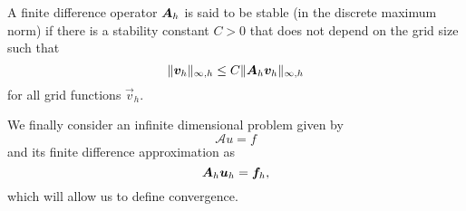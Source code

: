 \begin{definition}[Stability]
    A finite difference operator $\mat A_h$ is said to be stable (in the discrete maximum norm) if there is a stability constant $C>0$ that does not depend on the grid size such that
        \begin{equation}\label{def:stability}
            \| \vec v_h \|_{\infty,h} \leq C \|\mat A_h \vec v_h \|_{\infty,h}
        \end{equation}
        for all grid functions $\vec v_h$. 
\end{definition}
We finally consider an infinite dimensional problem given by
    \begin{equation}
        \mathcal A u = f
    \end{equation}
and its finite difference approximation as
    \begin{equation}\label{def:fd-approx}
        \mat A_h \vec u_h = \vec f_h,
    \end{equation}
which will allow us to define convergence. 

